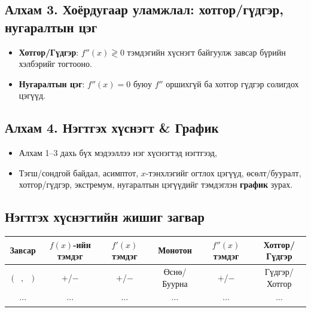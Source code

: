 \subsection*{Алхам 3. Хоёрдугаар уламжлал: хотгор/гүдгэр, нугаралтын цэг}
\begin{itemize}
  \item \textbf{Хотгор/Гүдгэр}: $f''(x)\gtrless 0$ тэмдэгийн хүснэгт байгуулж завсар бүрийн хэлбэрийг тогтооно.
  \item \textbf{Нугаралтын цэг}: $f''(x)=0$ буюу $f''$ оршихгүй ба  хотгор гүдгэр солигдох цэгүүд.
\end{itemize}

\subsection*{Алхам 4. Нэгтгэх хүснэгт \& График}
\begin{itemize}
  \item Алхам 1–3 дахь бүх мэдээллээ нэг хүснэгтэд нэгтгээд,
  \item Тэгш/сондгой байдал, асимптот, $x$-тэнхлэгийг огтлох цэгүүд, өсөлт/бууралт, хотгор/гүдгэр,
        экстремум, нугаралтын цэгүүдийг тэмдэглэн \textbf{график} зурах.
\end{itemize}

\subsection*{Нэгтгэх хүснэгтийн жишиг загвар}
\begin{center}
\renewcommand{\arraystretch}{1.2}
\begin{tabular}{|c|c|c|c|c|c|}
\hline
Завсар & $f(x)$-ийн тэмдэг & $f'(x)$ тэмдэг & Монотон & $f''(x)$ тэмдэг & Хотгор/Гүдгэр \\
\hline
$(\;\;,\;\;)$ & $+$/$-$ & $+$/$-$ & Өснө/Буурна & $+$/$-$ & Гүдгэр/Хотгор \\
\hline
$\cdots$ & $\cdots$ & $\cdots$ & $\cdots$ & $\cdots$ & $\cdots$ \\
\hline
\end{tabular}
\end{center}


